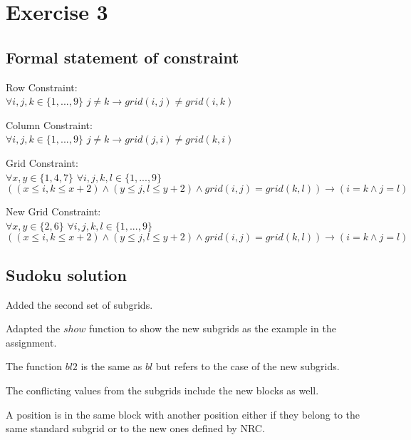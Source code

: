 \documentclass{article}
\begin{document}
\section*{Exercise 3}
\subsection*{Formal statement of constraint}
Row Constraint:\\
$\forall i,j,k \in \{1,...,9\}$ $  j\neq k  \rightarrow grid(i,j) \neq grid(i,k)$

Column Constraint:\\
$\forall i,j,k \in \{1,...,9\}$ $ j\neq k \rightarrow  grid(j,i) \neq grid(k,i)$

Grid Constraint:\\
 $\forall x,y \in \{1,4,7\}$ $\forall i,j,k,l \in \{1,...,9\}$ $((x \leq i,k \leq x+2) \land  (y \leq j,l \leq y+2) \land grid(i,j) = grid(k,l)) \rightarrow (i=k \land j=l) $

New Grid Constraint:\\
 $\forall x,y \in \{2,6\}$ $\forall i,j,k,l \in \{1,...,9\}$ $((x \leq i,k \leq x+2) \land  (y \leq j,l \leq y+2) \land grid(i,j) = grid(k,l)) \rightarrow (i=k \land j=l) $

\subsection*{Sudoku solution}
Added the second set of subgrids.


Adapted the $show$ function to show the new subgrids as the example in the assignment.


The function $bl2$ is the same as $bl$ but refers to the case of the new subgrids.


The conflicting values from the subgrids include the new blocks as well.



A position is in the same block with another position either if they belong to the same standard subgrid or to the new ones defined by NRC.

\end{document}
